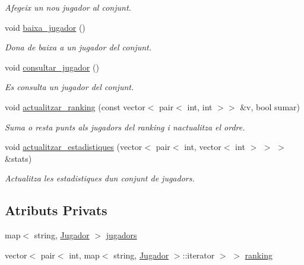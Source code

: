 \begin{DoxyCompactItemize}
\begin{DoxyCompactList}\small\item\em Afegeix un nou jugador al conjunt. \end{DoxyCompactList}\item 
void \mbox{\hyperlink{class_cjt__jugadors_a902057929aebe8b46ff16395ad22def2}{baixa\+\_\+jugador}} ()
\begin{DoxyCompactList}\small\item\em Dona de baixa a un jugador del conjunt. \end{DoxyCompactList}\item 
void \mbox{\hyperlink{class_cjt__jugadors_a2232be18d9336daa80680ee29a5e9f28}{consultar\+\_\+jugador}} ()
\begin{DoxyCompactList}\small\item\em Es consulta un jugador del conjunt. \end{DoxyCompactList}\item 
void \mbox{\hyperlink{class_cjt__jugadors_a5e12a36a7049121aef6a5cb46e6528ad}{actualitzar\+\_\+ranking}} (const vector$<$ pair$<$ int, int $>$$>$ \&v, bool sumar)
\begin{DoxyCompactList}\small\item\em Suma o resta punts als jugadors del ranking i n\textquotesingle{}actualitza el ordre. \end{DoxyCompactList}\item 
void \mbox{\hyperlink{class_cjt__jugadors_ade2368355d0198eef0c8d06c932f1a17}{actualitzar\+\_\+estadistiques}} (vector$<$ pair$<$ int, vector$<$ int $>$ $>$ $>$ \&stats)
\begin{DoxyCompactList}\small\item\em Actualitza les estadistiques d\textquotesingle{}un conjunt de jugadors. \end{DoxyCompactList}\end{DoxyCompactItemize}
\subsection*{Atributs Privats}
\begin{DoxyCompactItemize}
\item 
map$<$ string, \mbox{\hyperlink{class_jugador}{Jugador}} $>$ \mbox{\hyperlink{class_cjt__jugadors_a9a7fd899cca7f3c126120c8e7b4719d4}{jugadors}}
\item 
vector$<$ pair$<$ int, map$<$ string, \mbox{\hyperlink{class_jugador}{Jugador}} $>$\+::iterator $>$ $>$ \mbox{\hyperlink{class_cjt__jugadors_af9f7e71820fb657bf489ce72a31e8034}{ranking}}
\end{DoxyCompactItemize}


